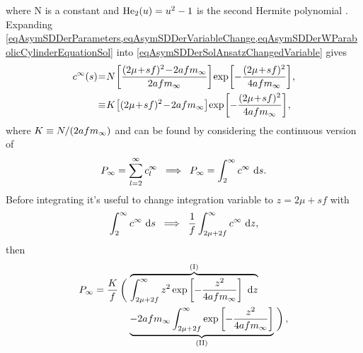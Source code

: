                 where N is a constant and $\mathrm{He}_2(u)=u^2-1$ is the second Hermite polynomial \cite[p. 99]{AMMOrszag1978}. Expanding \cref{eqAsymSDDerParameters,eqAsymSDDerVariableChange,eqAsymSDDerWParabolicCylinderEquationSol} into \eqref{eqAsymSDDerSolAnsatzChangedVariable} gives \cite[(76) on p. 11]{Goriely2019}
                \begin{equation*}
                    \SpazMate{1}{1}{1}
                    \begin{aligned}
                        c^\infty(s)&=N
                        \left[\frac{(2\mu+sf)^2-2af\mInf}{2af\mInf}\right]
                        \exp\left[-\frac{(2\mu+sf)^2}{4af\mInf}\right],\\
                        &\equiv K
                        \left[(2\mu+sf)^2-2af\mInf\right]
                        \exp\left[-\frac{(2\mu+sf)^2}{4af\mInf}\right],\\
                    \end{aligned}
                    \label{eqAsymSDDerSolAnsatz}
                \end{equation*}
                where $K\equiv N/(2afm_\infty)$ and can be found by considering the continuous version of
                \begin{equation}
                    \PInf=\sum_{l=2}^\infty c^\infty_l
                    \;\;\implies\;\;
                    \PInf=\int_2^\infty c^\infty\ \de s.
                    \label{eqAsymSDDerContinuousConditionSumToPInf}
                \end{equation}
                Before integrating it's useful to change integration variable to $z=2\mu+sf$ with
                $$
                    \int_2^\infty c^\infty\ \de s
                    \;\;\implies\;\;
                    \frac1f\int_{2\mu+2f}^\infty c^\infty\ \de z,
                $$
                then
                \begin{align*}
                    \PInf=\frac Kf
                    &\left(\vphantom{\int_{2\mu+2f}^\infty}\right.
                    \overbrace{\int_{2\mu+2f}^\infty z^2
                    \exp\left[-\frac{z^2}{4af\mInf}\right]\ \de z}^{(\text{I})}\\
                    &\quad\underbrace{-2af\mInf\int_{2\mu+2f}^\infty
                    \exp\left[-\frac{z^2}{4af\mInf}\right]}_{(\text{II})}
                    \left.\vphantom{\int_{2\mu+2f}^\infty}\right),
                \end{align*}
